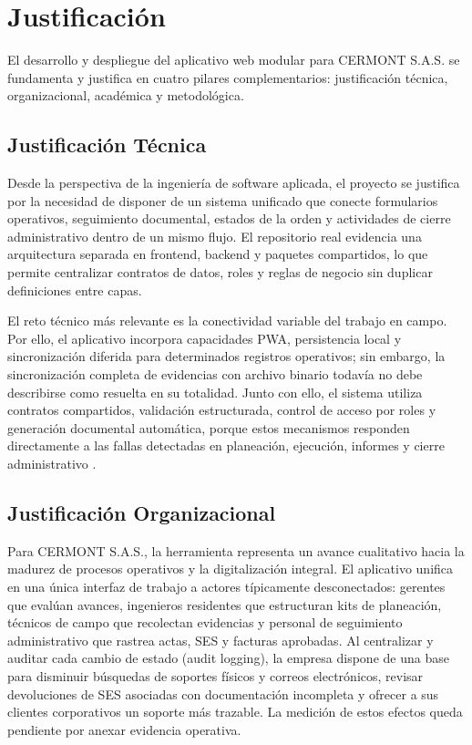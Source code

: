 \section{Justificación}
\label{sec:justificacion}

El desarrollo y despliegue del aplicativo web modular para CERMONT S.A.S. se fundamenta y justifica en cuatro pilares complementarios: justificación técnica, organizacional, académica y metodológica.

\subsection{Justificación Técnica}
Desde la perspectiva de la ingeniería de software aplicada, el proyecto se justifica por la necesidad de disponer de un sistema unificado que conecte formularios operativos, seguimiento documental, estados de la orden y actividades de cierre administrativo dentro de un mismo flujo. El repositorio real evidencia una arquitectura separada en frontend, backend y paquetes compartidos, lo que permite centralizar contratos de datos, roles y reglas de negocio sin duplicar definiciones entre capas.

El reto técnico más relevante es la conectividad variable del trabajo en campo. Por ello, el aplicativo incorpora capacidades PWA, persistencia local y sincronización diferida para determinados registros operativos; sin embargo, la sincronización completa de evidencias con archivo binario todavía no debe describirse como resuelta en su totalidad. Junto con ello, el sistema utiliza contratos compartidos, validación estructurada, control de acceso por roles y generación documental automática, porque estos mecanismos responden directamente a las fallas detectadas en planeación, ejecución, informes y cierre administrativo \cite{mdn_service_worker,owasp_top10}.

\subsection{Justificación Organizacional}
Para CERMONT S.A.S., la herramienta representa un avance cualitativo hacia la madurez de procesos operativos y la digitalización integral. El aplicativo unifica en una única interfaz de trabajo a actores típicamente desconectados: gerentes que evalúan avances, ingenieros residentes que estructuran kits de planeación, técnicos de campo que recolectan evidencias y personal de seguimiento administrativo que rastrea actas, SES y facturas aprobadas. Al centralizar y auditar cada cambio de estado (audit logging), la empresa dispone de una base para disminuir búsquedas de soportes físicos y correos electrónicos, revisar devoluciones de SES asociadas con documentación incompleta y ofrecer a sus clientes corporativos un soporte más trazable. La medición de estos efectos queda pendiente por anexar evidencia operativa.


